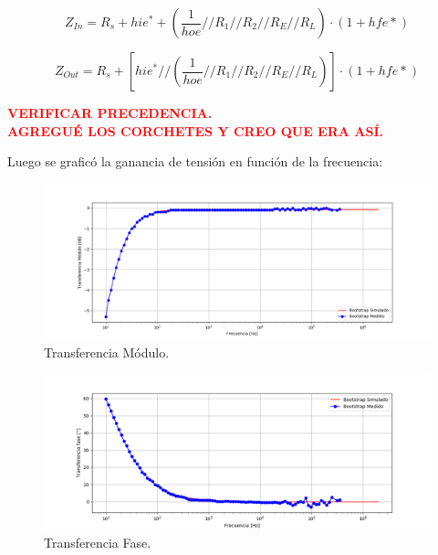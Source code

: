 \documentclass[a4paper]{article}
\begin{document}
\begin{equation}
	Z_{In} = R_s + hie^* + \left(\frac{1}{hoe} // R_1 // R_2 // R_E // R_L  \right)\cdot (1+hfe*)
\end{equation}

\begin{equation}
	Z_{Out} = R_s + \left[ hie^* //  \left(\frac{1}{hoe} // R_1 // R_2 // R_E // R_L  \right) \right] \cdot (1+hfe*)
\end{equation}

\begin{center}
	\textcolor{red}{\textbf{VERIFICAR PRECEDENCIA.}}\\
	\textcolor{red}{\textbf{AGREGUÉ LOS CORCHETES Y CREO QUE ERA ASÍ.}}
\end{center}

Luego se graficó la ganancia de tensión en función de la frecuencia:
\begin{figure} [H]
	\centering
	\includegraphics[width=\textwidth]{imagenes/avs.png}
	\caption{Transferencia Módulo.}
	\label{fig:transmod}
\end{figure}
\begin{figure} [H]
	\centering
	\includegraphics[width=\textwidth]{imagenes/avsp.png}
	\caption{Transferencia Fase.}
	\label{fig:transph}
\end{figure}
\end{document}
